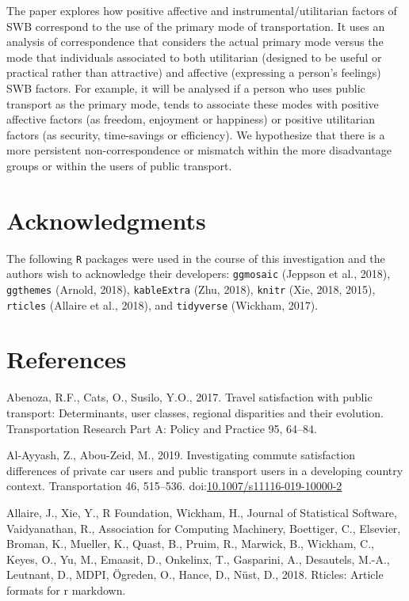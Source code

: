 \documentclass[]{elsarticle} %
\begin{document}
The paper explores how positive affective and instrumental/utilitarian
factors of SWB correspond to the use of the primary mode of
transportation. It uses an analysis of correspondence that considers the
actual primary mode versus the mode that individuals associated to both
utilitarian (designed to be useful or practical rather than attractive)
and affective (expressing a person's feelings) SWB factors. For example,
it will be analysed if a person who uses public transport as the primary
mode, tends to associate these modes with positive affective factors (as
freedom, enjoyment or happiness) or positive utilitarian factors (as
security, time-savings or efficiency). We hypothesize that there is a
more persistent non-correspondence or mismatch within the more
disadvantage groups or within the users of public transport.

\hypertarget{acknowledgments}{%
\section{Acknowledgments}\label{acknowledgments}}

The following \texttt{R} packages were used in the course of this
investigation and the authors wish to acknowledge their developers:
\texttt{ggmosaic} (Jeppson et al., 2018), \texttt{ggthemes} (Arnold,
2018), \texttt{kableExtra} (Zhu, 2018), \texttt{knitr} (Xie, 2018,
2015), \texttt{rticles} (Allaire et al., 2018), and \texttt{tidyverse}
(Wickham, 2017).

\hypertarget{references}{%
\section*{References}\label{references}}

\hypertarget{refs}{}
\leavevmode\hypertarget{ref-Abenoza2017travel}{}%
Abenoza, R.F., Cats, O., Susilo, Y.O., 2017. Travel satisfaction with
public transport: Determinants, user classes, regional disparities and
their evolution. Transportation Research Part A: Policy and Practice 95,
64--84.

\leavevmode\hypertarget{ref-Alayyash2019commute}{}%
Al-Ayyash, Z., Abou-Zeid, M., 2019. Investigating commute satisfaction
differences of private car users and public transport users in a
developing country context. Transportation 46, 515--536.
doi:\href{https://doi.org/10.1007/s11116-019-10000-2}{10.1007/s11116-019-10000-2}

\leavevmode\hypertarget{ref-Allaire2018rticles}{}%
Allaire, J., Xie, Y., R Foundation, Wickham, H., Journal of Statistical
Software, Vaidyanathan, R., Association for Computing Machinery,
Boettiger, C., Elsevier, Broman, K., Mueller, K., Quast, B., Pruim, R.,
Marwick, B., Wickham, C., Keyes, O., Yu, M., Emaasit, D., Onkelinx, T.,
Gasparini, A., Desautels, M.-A., Leutnant, D., MDPI, Ögreden, O., Hance,
D., Nüst, D., 2018. Rticles: Article formats for r markdown.
\end{document}
